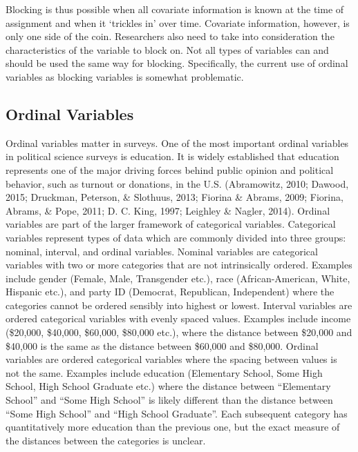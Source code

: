 \documentclass[12pt,econ]{sources/authesis}
\begin{document}
Blocking is thus possible when all covariate information is known at the time of assignment and when it `trickles in' over time. Covariate information, however, is only one side of the coin. Researchers also need to take into consideration the characteristics of the variable to block on. Not all types of variables can and should be used the same way for blocking. Specifically, the current use of ordinal variables as blocking variables is somewhat problematic.

\hypertarget{ordblock-theory-ordinal}{%
\subsection{Ordinal Variables}\label{ordblock-theory-ordinal}}

Ordinal variables matter in surveys. One of the most important ordinal variables in political science surveys is education. It is widely established that education represents one of the major driving forces behind public opinion and political behavior, such as turnout or donations, in the U.S. (Abramowitz, 2010; Dawood, 2015; Druckman, Peterson, \& Slothuus, 2013; Fiorina \& Abrams, 2009; Fiorina, Abrams, \& Pope, 2011; D. C. King, 1997; Leighley \& Nagler, 2014). Ordinal variables are part of the larger framework of categorical variables. Categorical variables represent types of data which are commonly divided into three groups: nominal, interval, and ordinal variables. Nominal variables are categorical variables with two or more categories that are not intrinsically ordered. Examples include gender (Female, Male, Transgender etc.), race (African-American, White, Hispanic etc.), and party ID (Democrat, Republican, Independent) where the categories cannot be ordered sensibly into highest or lowest. Interval variables are ordered categorical variables with evenly spaced values. Examples include income (\$20,000, \$40,000, \$60,000, \$80,000 etc.), where the distance between \$20,000 and \$40,000 is the same as the distance between \$60,000 and \$80,000. Ordinal variables are ordered categorical variables where the spacing between values is not the same. Examples include education (Elementary School, Some High School, High School Graduate etc.) where the distance between ``Elementary School'' and ``Some High School'' is likely different than the distance between ``Some High School'' and ``High School Graduate''. Each subsequent category has quantitatively more education than the previous one, but the exact measure of the distances between the categories is unclear.
\end{document}
